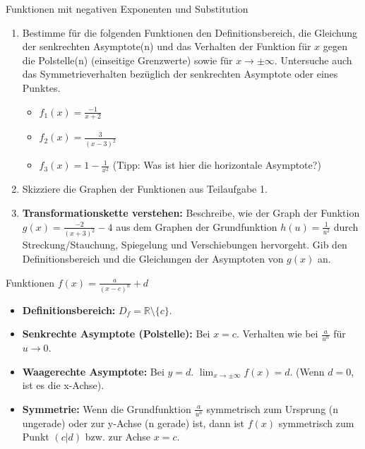\begin{aufgabenumgebung}{Funktionen mit negativen Exponenten und Substitution}
\begin{enumerate}
    \item Bestimme für die folgenden Funktionen den Definitionsbereich, die Gleichung der senkrechten Asymptote(n) und das Verhalten der Funktion für $x$ gegen die Polstelle(n) (einseitige Grenzwerte) sowie für $x \to \pm\infty$. Untersuche auch das Symmetrieverhalten bezüglich der senkrechten Asymptote oder eines Punktes.
        \begin{itemize}
            \item $f_1(x) = \frac{-1}{x+2}$
            \item $f_2(x) = \frac{3}{(x-3)^2}$
            \item $f_3(x) = 1 - \frac{1}{x^2}$ (Tipp: Was ist hier die horizontale Asymptote?)
        \end{itemize}
    \item Skizziere die Graphen der Funktionen aus Teilaufgabe 1.
    \item \textbf{Transformationskette verstehen:}
        Beschreibe, wie der Graph der Funktion $g(x) = \frac{-2}{(x+3)^2} - 4$ aus dem Graphen der Grundfunktion $h(u) = \frac{1}{u^2}$ durch Streckung/Stauchung, Spiegelung und Verschiebungen hervorgeht. Gib den Definitionsbereich und die Gleichungen der Asymptoten von $g(x)$ an.
\end{enumerate}
\end{aufgabenumgebung}

\begin{kurzknappumgebung}{Funktionen $f(x) = \frac{a}{(x-c)^n} + d$}
\begin{itemize}
    \item \textbf{Definitionsbereich:} $D_f = \mathbb{R} \setminus \{c\}$.
    \item \textbf{Senkrechte Asymptote (Polstelle):} Bei $x=c$. Verhalten wie bei $\frac{a}{u^n}$ für $u \to 0$.
    \item \textbf{Waagerechte Asymptote:} Bei $y=d$. $\lim_{x \to \pm\infty} f(x) = d$. (Wenn $d=0$, ist es die x-Achse).
    \item \textbf{Symmetrie:} Wenn die Grundfunktion $\frac{a}{u^n}$ symmetrisch zum Ursprung (n ungerade) oder zur y-Achse (n gerade) ist, dann ist $f(x)$ symmetrisch zum Punkt $(c|d)$ bzw. zur Achse $x=c$.
\end{itemize}
\end{kurzknappumgebung}

